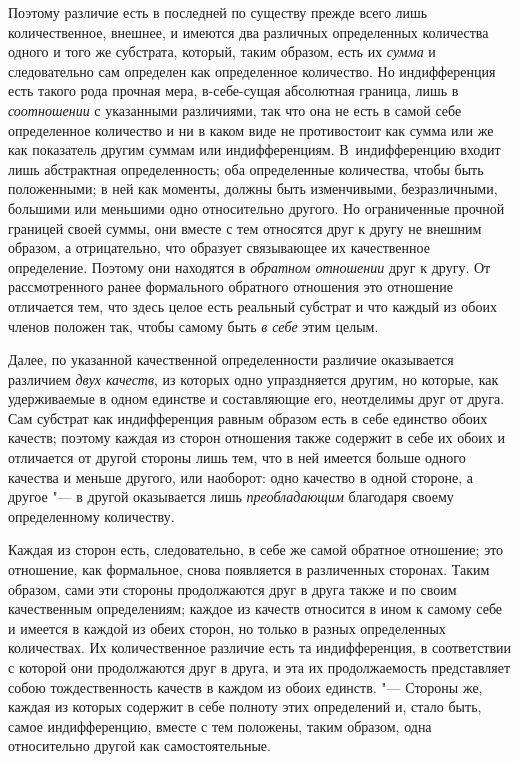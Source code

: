 Поэтому различие есть в последней по существу прежде всего лишь
количественное, внешнее, и имеются два различных определенных количества
одного и того же субстрата, который, таким образом, есть их
{\em сумма} и следовательно сам определен как
определенное количество. Но индифференция есть такого рода прочная мера,
в-себе-сущая абсолютная граница, лишь в
{\em соотношении} с указанными различиями, так что она
не есть в самой себе определенное количество и ни в каком виде не
противостоит как сумма или же как показатель другим суммам или
индифференциям. В~индифференцию входит лишь абстрактная определенность; оба
определенные количества, чтобы быть положенными; в ней как моменты, должны
быть изменчивыми, безразличными, большими или меньшими одно относительно
другого. Но ограниченные прочной границей своей суммы, они вместе с тем
относятся друг к другу не внешним образом, а отрицательно, что образует
связывающее их качественное определение. Поэтому они находятся в
{\em обратном отношении} друг к другу. От
рассмотренного ранее формального обратного отношения это отношение
отличается тем, что здесь целое есть реальный субстрат и что каждый из
обоих членов положен так, чтобы самому быть {\em в себе} этим целым.

Далее, по указанной качественной определенности различие оказывается
различием {\em двух качеств}, из которых одно
упраздняется другим, но которые, как удерживаемые в одном единстве и
составляющие его, неотделимы друг от друга. Сам субстрат как индифференция
равным образом есть в себе единство обоих качеств; поэтому каждая из сторон
отношения также содержит в себе их обоих и отличается от другой стороны
лишь тем, что в ней имеется больше одного качества и меньше другого, или
наоборот: одно качество в одной стороне, а другое "--- в другой оказывается
лишь {\em преобладающим} благодаря своему определенному количеству.

Каждая из сторон есть, следовательно, в себе же самой обратное отношение;
это отношение, как формальное, снова появляется в различенных сторонах.
Таким образом, сами эти стороны продолжаются друг в друга также и по своим
качественным определениям; каждое из качеств относится в ином к самому
себе и имеется в каждой из обеих сторон, но только в разных определенных
количествах. Их количественное различие есть та индифференция, в
соответствии с которой они продолжаются друг в друга, и эта их
продолжаемость представляет собою тождественность качеств в каждом из обоих
единств. "--- Стороны же, каждая из которых содержит в себе полноту этих
определений и, стало быть, самое индифференцию, вместе с тем положены, таким
образом, одна относительно другой как самостоятельные.

